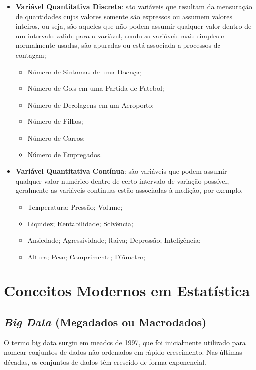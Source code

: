 \newpage
\begin{itemize}
  \item \textbf{Variável Quantitativa Discreta}: são variáveis que resultam da mensuração de quantidades cujos valores somente são expressos ou assumem valores inteiros, ou seja, são aqueles que não podem assumir qualquer valor dentro de um intervalo valido para a variável, sendo as variáveis mais simples e normalmente usadas, são apuradas ou está associada a processos de contagem;

 \begin{itemize}
   \item Número de Sintomas de uma Doença;
   \item Número de Gols em uma Partida de Futebol;
   \item Número de Decolagens em um Aeroporto;
   \item Número de Filhos;
   \item Número de Carros;
   \item Número de Empregados.
 \end{itemize}
  \item \textbf{Variável Quantitativa Contínua}: são variáveis que podem assumir qualquer valor numérico dentro de certo intervalo de variação possível, geralmente as variáveis continuas estão associadas à medição, por exemplo.
\begin{itemize}
  \item Temperatura; Pressão; Volume;
  \item Liquidez; Rentabilidade; Solvência;
  \item Ansiedade; Agressividade; Raiva; Depressão; Inteligência;
  \item Altura; Peso; Comprimento; Diâmetro;
\end{itemize}
\end{itemize}



\newpage
\section{Conceitos Modernos em Estatística}

\subsection{\textit{Big Data} (Megadados ou Macrodados)}


O termo big data surgiu em meados de 1997, que foi inicialmente utilizado para nomear conjuntos de dados não ordenados em rápido crescimento. Nas últimas décadas, os conjuntos de dados têm crescido de forma exponencial.


